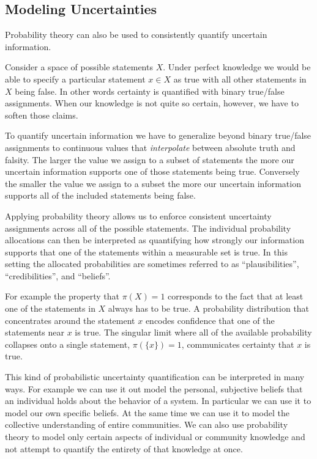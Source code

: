 \documentclass[
  letterpaper,
  DIV=11,
  numbers=noendperiod]{scrartcl}
\begin{document}
\hypertarget{modeling-uncertainties}{%
\subsection{Modeling Uncertainties}\label{modeling-uncertainties}}

Probability theory can also be used to consistently quantify uncertain
information.

Consider a space of possible statements \(X\). Under perfect knowledge
we would be able to specify a particular statement \(x \in X\) as true
with all other statements in \(X\) being false. In other words certainty
is quantified with binary true/false assignments. When our knowledge is
not quite so certain, however, we have to soften those claims.

To quantify uncertain information we have to generalize beyond binary
true/false assignments to continuous values that \emph{interpolate}
between absolute truth and falsity. The larger the value we assign to a
subset of statements the more our uncertain information supports one of
those statements being true. Conversely the smaller the value we assign
to a subset the more our uncertain information supports all of the
included statements being false.

Applying probability theory allows us to enforce consistent uncertainty
assignments across all of the possible statements. The individual
probability allocations can then be interpreted as quantifying how
strongly our information supports that one of the statements within a
measurable set is true. In this setting the allocated probabilities are
sometimes referred to as ``plausibilities'', ``credibilities'', and
``beliefs''.

For example the property that \(\pi(X) = 1\) corresponds to the fact
that at least one of the statements in \(X\) always has to be true. A
probability distribution that concentrates around the statement \(x\)
encodes confidence that one of the statements near \(x\) is true. The
singular limit where all of the available probability collapses onto a
single statement, \(\pi( \{ x \} ) = 1\), communicates certainty that
\(x\) is true.

This kind of probabilistic uncertainty quantification can be interpreted
in many ways. For example we can use it out model the personal,
subjective beliefs that an individual holds about the behavior of a
system. In particular we can use it to model our own specific beliefs.
At the same time we can use it to model the collective understanding of
entire communities. We can also use probability theory to model only
certain aspects of individual or community knowledge and not attempt to
quantify the entirety of that knowledge at once.
\end{document}
